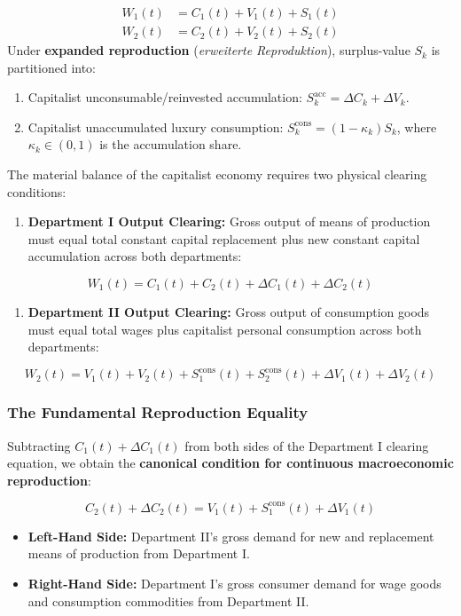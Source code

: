 \documentclass[11pt,letterpaper]{report}
\begin{document}
\[
\begin{aligned} W_1(t) &= C_1(t) + V_1(t) + S_1(t) \\ W_2(t) &= C_2(t) + V_2(t) + S_2(t) \end{aligned}
\]
Under \textbf{expanded reproduction} (\emph{erweiterte Reproduktion}), surplus-value ${S}_{k}$ is partitioned into:

\begin{enumerate}
\item Capitalist unconsumable/reinvested accumulation: ${S}_{k}^{\mathrm{acc}}=\Delta {C}_{k}+\Delta {V}_{k}$.
\item Capitalist unaccumulated luxury consumption: ${S}_{k}^{\mathrm{cons}}=(1-{\kappa }_{k}){S}_{k}$, where ${\kappa }_{k}\in (0,1)$ is the accumulation share.
\end{enumerate}
The material balance of the capitalist economy requires two physical clearing conditions:

\begin{enumerate}
\item \textbf{Department I Output Clearing:} Gross output of means of production must equal total constant capital replacement plus new constant capital accumulation across both departments:
\end{enumerate}
\[
{W}_{1}(t)={C}_{1}(t)+{C}_{2}(t)+\Delta {C}_{1}(t)+\Delta {C}_{2}(t)
\]
\begin{enumerate}
\item \textbf{Department II Output Clearing:} Gross output of consumption goods must equal total wages plus capitalist personal consumption across both departments:
\end{enumerate}
\[
{W}_{2}(t)={V}_{1}(t)+{V}_{2}(t)+{S}_{1}^{\mathrm{cons}}(t)+{S}_{2}^{\mathrm{cons}}(t)+\Delta {V}_{1}(t)+\Delta {V}_{2}(t)
\]
\subsubsection{The Fundamental Reproduction Equality}
Subtracting ${C}_{1}(t)+\Delta {C}_{1}(t)$ from both sides of the Department I clearing equation, we obtain the \textbf{canonical condition for continuous macroeconomic reproduction}:

\[
{C}_{2}(t)+\Delta {C}_{2}(t)={V}_{1}(t)+{S}_{1}^{\mathrm{cons}}(t)+\Delta {V}_{1}(t)
\]
\begin{itemize}
\item \textbf{Left-Hand Side:} Department II's gross demand for new and replacement means of production from Department I.
\item \textbf{Right-Hand Side:} Department I's gross consumer demand for wage goods and consumption commodities from Department II.
\end{itemize}
\end{document}

